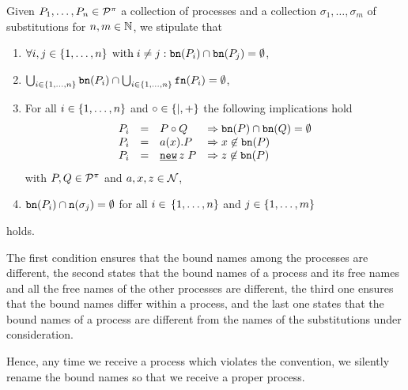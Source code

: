 \begin{conv}
\label{conv_uni_bn}
Given $P_1,\ldots,P_n\in\mathcal P^{\pi}$ a collection of \picalc{} processes and a collection $\sigma_1,\ldots,\sigma_m$ of substitutions for $n,m\in\mathbb N$, we stipulate that
\begin{enumerate}
	\item $\forall{}i,j\in\set{1,\ldots,n}\;\text{with}\;i\neq{}j: \bn{P_i}\cap\bn{P_j} = \emptyset$,
	\item $\bigcup_{i\in\set{1,\ldots,n}}\bn{P_i} \cap \bigcup_{i\in\set{1,\ldots,n}}\fn{P_i} = \emptyset$,
	\item For all $i\in\set{1,\dots,n}$ and $\circ\in\set{\procpar{}{},\procchoice{}{}}$ the following implications hold
		\begin{align*}
			\begin{array}{lcll}
				P_i&=&P\circ{}Q &\Rightarrow \bn{P}\cap\bn{Q}=\emptyset \\
				P_i&=&\inp{a}{x}.P &\Rightarrow x\nin\bn{P} \\
				P_i&=&\procres{z}{P} &\Rightarrow  z\nin\bn{P}
			\end{array}
		\end{align*}
		with $P,Q\in\mathcal P^{\pi}$ and $a,x,z\in\mathcal N$,
	\item $\mathtt{bn}(P_i)\cap\mathtt{n}(\sigma_j)=\emptyset$ for all $i\in{}\set{1,\ldots,n}$ and $j\in\set{1,\dots,m}$
\end{enumerate}
holds.
\end{conv}

The first condition ensures that the bound names among the processes are different, the second states that the bound names of a process and its free names and all the free names of the other processes are different, the third one ensures that the bound names differ within a process, and the last one states that the bound names of a process are different from the names of the substitutions under consideration.

Hence, any time we receive a process which violates the convention, we silently rename the bound names so that we receive a proper process.
